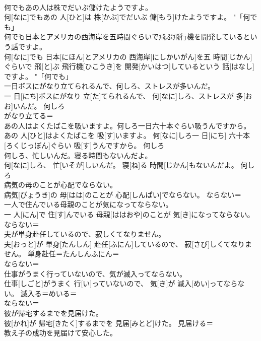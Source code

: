 \documentclass[8pt]{extreport}
\begin{document}
\begin{CJK}{UTF8}{min}
\\	何でもあの人は株でだいぶ儲けたようですよ。	
\\	何[なに]でもあの 人[ひと]は 株[かぶ]でだいぶ 儲[もう]けたようですよ。	"「何でも」 
\\	何でも日本とアメリカの西海岸を五時間ぐらいで飛ぶ飛行機を開発しているという話ですよ。	
\\	何[なに]でも 日本[にほん]とアメリカの 西海岸[にしかいがん]を五 時間[じかん]ぐらいで 飛[と]ぶ 飛行機[ひこうき]を 開発[かいはつ]しているという 話[はなし]ですよ。	"「何でも」 
\\	一日ボスにがなり立てられるんで、何しろ、ストレスが多いんだ。	
\\	一 日[にち]ボスにがなり 立[た]てられるんで、 何[なに]しろ、ストレスが 多[おお]いんだ。	何しろ 
\\	がなり立てる＝ 
\\	あの人はよくたばこを吸いますよ。何しろ一日六十本ぐらい吸うんですから。	
\\	あの 人[ひと]はよくたばこを 吸[す]いますよ。 何[なに]しろ一 日[にち] 六十本[ろくじっぽん]ぐらい 吸[す]うんですから。	何しろ 
\\	何しろ、忙しいんだ。寝る時間もないんだよ。	
\\	何[なに]しろ、 忙[いそが]しいんだ。 寝[ね]る 時間[じかん]もないんだよ。	何しろ 
\\	病気の母のことが心配でならない。	
\\	病気[びょうき]の 母[はは]のことが 心配[しんぱい]でならない。	ならない＝ 
\\	一人で住んでいる母親のことが気になってならない。	
\\	一 人[にん]で 住[す]んでいる 母親[ははおや]のことが 気[き]になってならない。	ならない＝ 
\\	夫が単身赴任しているので、寂しくてなりません。	
\\	夫[おっと]が 単身[たんしん] 赴任[ふにん]しているので、 寂[さび]しくてなりません。	単身赴任＝たんしんふにん＝ 
\\	ならない＝ 
\\	仕事がうまく行っていないので、気が滅入ってならない。	
\\	仕事[しごと]がうまく 行[い]っていないので、 気[き]が 滅入[めい]ってならない。	滅入る＝めいる＝ 
\\	ならない＝ 
\\	彼が帰宅するまでを見届けた。	
\\	彼[かれ]が 帰宅[きたく]するまでを 見届[みとど]けた。	見届ける＝ 
\\	教え子の成功を見届けて安心した。	

\end{CJK}
\end{document}
